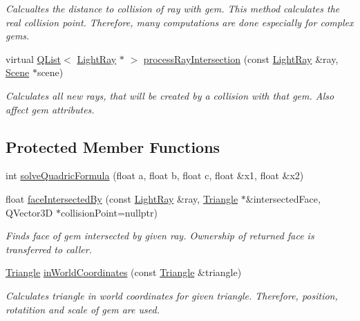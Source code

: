 \begin{DoxyCompactItemize}
\begin{DoxyCompactList}\small\item\em Calcualtes the distance to collision of ray with gem.  This method calculates the real collision point. Therefore, many computations are done especially for complex gems. \end{DoxyCompactList}\item 
virtual \hyperlink{singleton_q_list}{Q\+List}$<$ \hyperlink{class_light_ray}{Light\+Ray} $\ast$ $>$ \hyperlink{class_abstract_gem_ab4f3c6d38acbe59a610c67588e4944d7}{process\+Ray\+Intersection} (const \hyperlink{class_light_ray}{Light\+Ray} \&ray, \hyperlink{class_scene}{Scene} $\ast$scene)
\begin{DoxyCompactList}\small\item\em Calculates all new rays, that will be created by a collision with that gem. Also affect gem attributes. \end{DoxyCompactList}\end{DoxyCompactItemize}
\subsection*{Protected Member Functions}
\begin{DoxyCompactItemize}
\item 
int \hyperlink{class_abstract_gem_a85e872137d38a2c4a9a38f1f0b996bdc}{solve\+Quadric\+Formula} (float a, float b, float c, float \&x1, float \&x2)
\item 
float \hyperlink{class_abstract_gem_a446d8e7a7296203789414ae5b93e0bde}{face\+Intersected\+By} (const \hyperlink{class_light_ray}{Light\+Ray} \&ray, \hyperlink{class_triangle}{Triangle} $\ast$\&intersected\+Face, Q\+Vector3\+D $\ast$collision\+Point=nullptr)
\begin{DoxyCompactList}\small\item\em Finds face of gem intersected by given ray. Ownership of returned face is transferred to caller. \end{DoxyCompactList}\item 
\hyperlink{class_triangle}{Triangle} \hyperlink{class_abstract_gem_a18523ca4a999d5159e38003b3fad5f20}{in\+World\+Coordinates} (const \hyperlink{class_triangle}{Triangle} \&triangle)
\begin{DoxyCompactList}\small\item\em Calculates triangle in world coordinates for given triangle. Therefore, position, rotatition and scale of gem are used. \end{DoxyCompactList}\end{DoxyCompactItemize}
